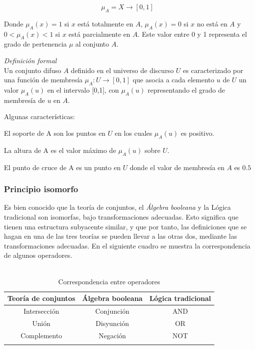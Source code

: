 \begin{displaymath}
\mu_A = X \rightarrow \left[ 0,1 \right]
\end{displaymath}


Donde $\mu_A(x) = 1$ si $x$ está totalmente en $A$,
$\mu_A(x) = 0$ si $x$ no está en $A$
y $ 0 < \mu_A(x) < 1 $ si $x$ está parcialmente en $A$.
Este valor entre 0 y 1 representa el grado de pertenencia $\mu$ al conjunto $A$.


\textit{Definición formal}\\
Un conjunto difuso $A$ definido en el universo de discurso $U$ es caracterizado por una función de membresía $\mu_A : U \rightarrow [0,1]$ que asocia a cada elemento $u$ de $U$ un valor $\mu_A(u)$ en el intervalo [0,1], con $\mu_A(u)$ representando el grado de membresía de $u$ en $A$.

Algunas características:
{\setlength{\baselineskip}{0.7\baselineskip}\begin{description}
	\item El soporte de A son los puntos en $U$ en los cuales $\mu_A(u)$ es positivo.
	\item La altura de A es el valor máximo de $\mu_A(u)$ sobre $U$.
	\item El punto de cruce de A es un punto en $U$ donde el valor de membresía en $A$ es $0.5$
\end{description}}





\subsubsection{Principio isomorfo}

Es bien conocido que la teoría de conjuntos, el \textit{Álgebra booleana} y la Lógica tradicional son isomorfas, bajo transformaciones adecuadas. Esto significa que tienen una estructura subyacente similar, y que por tanto, las definiciones que se hagan en una de las tres teorías se pueden llevar a las otras dos, mediante las transformaciones adecuadas.
En el siguiente cuadro se muestra la correspondencia de algunos operadores.\\\\


\begin{longtable}{|c|c|c|} 
	\hline
	Teoría de conjuntos & Álgebra booleana & Lógica tradicional \\ \hline
	Intersección & Conjunción & AND \\ \hline
	Unión & Disyunción & OR \\ \hline
	Complemento & Negación & NOT \\ \hline
	\caption{Correspondencia entre operadores} \label{table:tblop}
\end{longtable}

